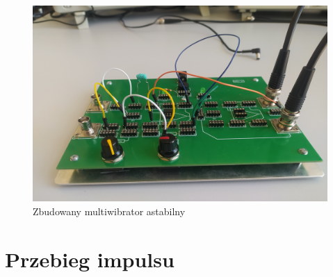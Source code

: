 \begin{itemize}
\begin{figure}[H]
            \includegraphics[scale=0.25]{img/phone/1651502036744_scaled.png}
            \caption{Zbudowany multiwibrator astabilny}
            \label{fig:multiwibrator_astabilny}
        \end{figure}
\end{itemize}

\pagebreak

\section{Przebieg impulsu}

